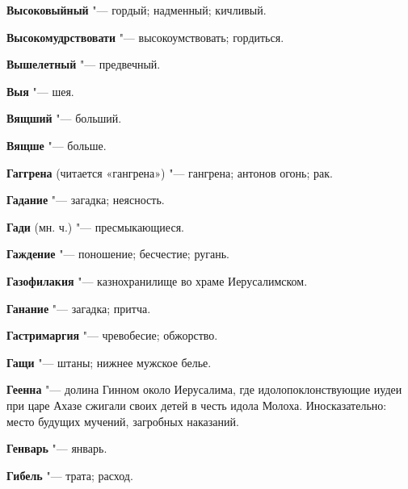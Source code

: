 \begin{mymulticols}{2}
\noindent\textbf{Высоковыйный} "--- гордый; надменный; кичливый. 




\noindent\textbf{Высокомудрствовати} "--- высокоумствовать; гордиться. 




\noindent\textbf{Вышелетный} "--- предвечный. 




\noindent\textbf{Выя} "--- шея. 




\noindent\textbf{Вящший} "--- больший. 




\noindent\textbf{Вящше} "--- больше. 




\bukvaending






\noindent\textbf{Гаггрена} (читается «гангрена») "--- гангрена; антонов огонь; рак. 




\noindent\textbf{Гадание} "--- загадка; неясность. 




\noindent\textbf{Гади} (мн. ч.) "--- пресмыкающиеся. 




\noindent\textbf{Гаждение} "--- поношение; бесчестие; ругань. 




\noindent\textbf{Газофилакия} "--- казнохранилище во храме Иерусалимском. 




\noindent\textbf{Ганание} "--- загадка; притча. 




\noindent\textbf{Гастримаргия} "--- чревобесие; обжорство. 




\noindent\textbf{Гащи} "--- штаны; нижнее мужское белье. 




\noindent\textbf{Геенна} "--- долина Гинном около Иерусалима, где идолопоклонствующие иудеи при царе Ахазе сжигали своих детей в честь идола Молоха. Иносказательно: место будущих мучений, загробных наказаний. 




\noindent\textbf{Генварь} "--- январь. 




\noindent\textbf{Гибель} "--- трата; расход. 





\end{mymulticols}
